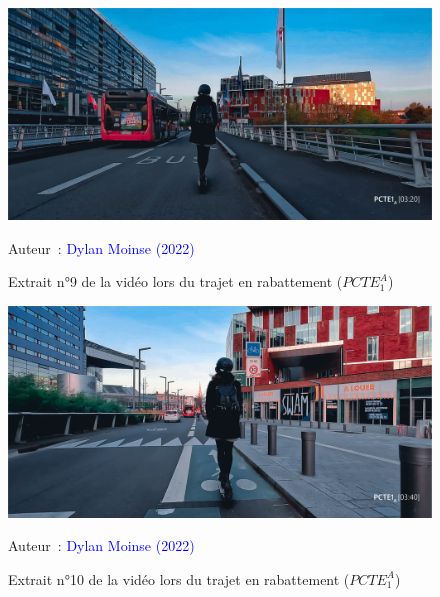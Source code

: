     \begin{figure}[h!]\vspace*{4pt}
        \caption*{Extrait n°9 de la vidéo lors du trajet en rabattement (\(PCTE^{A}_{1}\))}
        \centerline{\includegraphics[width=0.75\columnwidth]{src/Figures/Annexes/Extrait_Video_PCTE1_Access_9.jpg}}
        \vspace{5pt}
        \begin{flushright}\scriptsize{
        Auteur~: \textcolor{blue}{Dylan Moinse (2022)}
        }\end{flushright}
    \end{figure}

    \begin{figure}[h!]\vspace*{4pt}
        \caption*{Extrait n°10 de la vidéo lors du trajet en rabattement (\(PCTE^{A}_{1}\))}
        \centerline{\includegraphics[width=0.75\columnwidth]{src/Figures/Annexes/Extrait_Video_PCTE1_Access_10.jpg}}
        \vspace{5pt}
        \begin{flushright}\scriptsize{
        Auteur~: \textcolor{blue}{Dylan Moinse (2022)}
        }\end{flushright}
    \end{figure}
    
